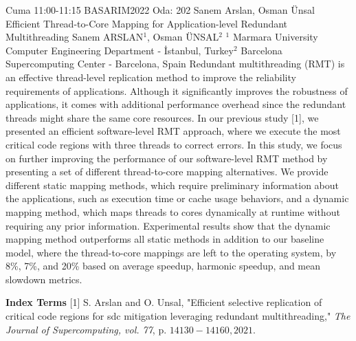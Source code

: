 
    \begin{abstract_basarim}
    {Cuma 11:00-11:15}
    {BASARIM2022}
    {Oda: 202}
    {Sanem Arslan, Osman Ünsal}
    {Efficient Thread-to-Core Mapping for Application-level Redundant Multithreading}
    {%
    Sanem ARSLAN$^{1}$, Osman ÜNSAL$^{2}$}
    {%
    }
    {%
    $^1$ Marmara University Computer Engineering Department - İstanbul, Turkey\newline{}$^2$ Barcelona Supercomputing Center - Barcelona, Spain}
    Redundant multithreading (RMT) is an effective thread-level replication method to improve the reliability requirements of applications. Although it significantly improves the robustness of applications, it comes with additional performance overhead since the redundant threads might share the same core resources. In our previous study [1], we presented an efficient software-level RMT approach, where we execute the most critical code regions with three threads to correct errors. In this study, we focus on further improving the performance of our software-level RMT method by presenting a set of different thread-to-core mapping alternatives. We provide different static mapping methods, which require preliminary information about the applications, such as execution time or cache usage behaviors, and a dynamic mapping method, which maps threads to cores dynamically at runtime without requiring any prior information. Experimental results show that the dynamic mapping method outperforms all static methods in addition to our baseline model, where the thread-to-core mappings are left to the operating system, by 8\%, 7\%, and 20\% based on average speedup, harmonic speedup, and mean slowdown metrics. 
    
            \textbf{Index Terms} \newline{}[1] S. Arslan and O. Unsal, "Efficient selective replication of critical code regions for sdc mitigation leveraging redundant multithreading," \textit{The Journal of Supercomputing, vol. 77}, p. $14130-14160,2021$.
    \end{abstract_basarim}
    